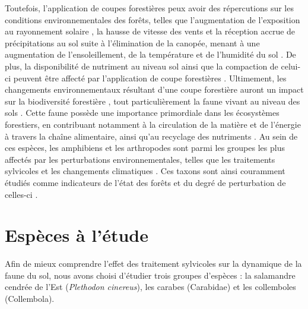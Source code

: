 Toutefois, l'application de coupes forestières peux avoir des répercutions sur les conditions environnementales des forêts, 
telles que l'augmentation de l'exposition au rayonnement solaire , la hausse de vitesse des vents et la réception accrue de précipitations au sol suite à l'élimination de la canopée, 
menant à une augmentation de l'ensoleillement, de la température et de l'humidité du sol \citep{Keenan1993ecologicaleffects,Lindo2003Microbialbiomass,Heithecker2007Edgerelatedgradients}.
De plus, la disponibilité de nutriment au niveau sol ainsi que la compaction de celui-ci peuvent être affecté par l'application de coupe forestières \citep{Battigelli2004Shorttermimpact,Covington1981Changesforest,Lindo2003Microbialbiomass,rousseauLongtermEffectsBiomass2018}. 
Ultimement, les changements environnementaux résultant d'une coupe forestière auront un impact sur la biodiversité forestière \citep{Chaudhary2016Impactforest,Fedrowitz2014Canretention,Paillet2010Biodiversitydifferences}, 
tout particulièrement la faune vivant au niveau des sols \citep{Chaudhary2016Impactforest,Lindo2003Microbialbiomass,Kudrin2023metaanalysiseffects}.
Cette faune possède une importance primordiale dans les écosystèmes forestiers, en contribuant notamment à la circulation de la matière et de l'énergie à travers la chaîne alimentaire, ainsi qu'au recyclage des nutriments \citep{Kudrin2023metaanalysiseffects,Seibold2021contributioninsects}.
Au sein de ces espèces, les amphibiens et les arthropodes sont parmi les groupes les plus affectés par les perturbations environnementales, 
telles que les traitements sylvicoles \citep{Hartshorn2021reviewforest,Semlitsch2009Effectstimber,Stuart2004Statustrends} et les changements climatiques \citep{Alford1999Globalamphibian,Milanovich2010Projectedloss,Parmesan2006EcologicalEvolutionary,Pounds2006Widespreadamphibian,Warren2018projectedeffect}. 
Ces taxons sont ainsi couramment étudiés comme indicateurs de l'état des forêts et du degré de perturbation de celles-ci \citep{birdChangesSoilLitter2004,Maleque2009Arthropodsbioindicators,pongeVerticalDistributionCollembola2000}.


\section*{Espèces à l'étude}
\label{sec:species}

Afin de mieux comprendre l'effet des traitement sylvicoles sur la dynamique de la faune du sol, nous avons choisi d'étudier trois groupes d'espèces : la salamandre cendrée de l'Est (\textit{Plethodon cinereus}), 
les carabes (Carabidae) et les collemboles (Collembola).

